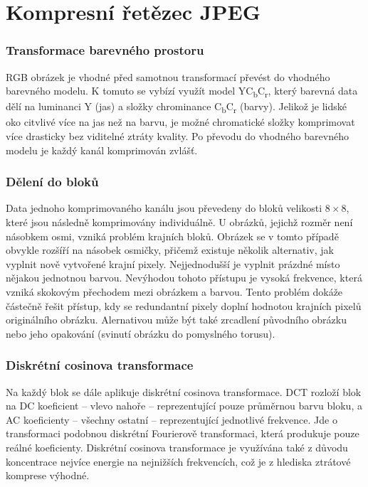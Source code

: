 \section{Kompresní řetězec JPEG}
\label{jpeg}

\subsubsection*{Transformace barevného prostoru}

RGB obrázek je vhodné před samotnou transformací převést do vhodného barevného modelu.
K tomuto se vybízí využít model YC\textsubscript{b}C\textsubscript{r}, který barevná data dělí na luminanci Y (jas) a složky chrominance C\textsubscript{b}C\textsubscript{r} (barvy).
Jelikož je lidské oko citvlivé více na jas než na barvu, je možné chromatické složky komprimovat více drasticky bez viditelné ztráty kvality.
Po převodu do vhodného barevného modelu je každý kanál komprimován zvlášť.

\subsubsection*{Dělení do bloků}

Data jednoho komprimovaného kanálu jsou převedeny do bloků velikosti $8\times8$, které jsou následně komprimovány individuálně.
U obrázků, jejichž rozměr není násobkem osmi, vzniká problém krajních bloků.
Obrázek se v tomto případě obvykle rozšíří na násobek osmičky, přičemž existuje několik alternativ, jak vyplnit nově vytvořené krajní pixely.
Nejjednodušší je vyplnit prázdné místo nějakou jednotnou barvou.
Nevýhodou tohoto přístupu je vysoká frekvence, která vzniká skokovým přechodem mezi obrázkem a barvou.
Tento problém dokáže částečně řešit přístup, kdy se redundantní pixely doplní hodnotou krajních pixelů originálního obrázku.
Alernativou může být také zrcadlení původního obrázku nebo jeho opakování (svinutí obrázku do pomyslného torusu).

\subsubsection*{Diskrétní cosinova transformace}

Na každý blok se dále aplikuje diskrétní cosinova transformace.
DCT rozloží blok na DC koeficient -- vlevo nahoře -- reprezentující pouze průměrnou barvu bloku, a AC koeficienty -- všechny ostatní -- reprezentující jednotlivé frekvence.
Jde o transformaci podobnou diskrétní Fourierově transformaci, která produkuje pouze reálné koeficienty.
Diskrétní cosinova transformace je využívána také z důvodu koncentrace nejvíce energie na nejnižších frekvencích, což je z hlediska ztrátové komprese výhodné.

